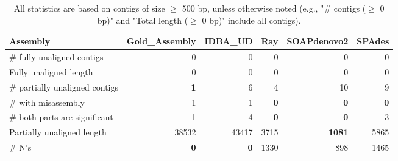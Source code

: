 \documentclass[12pt,a4paper]{article}
\begin{document}
\begin{table}[ht]
\begin{center}
\caption{All statistics are based on contigs of size $\geq$ 500 bp, unless otherwise noted (e.g., "\# contigs ($\geq$ 0 bp)" and "Total length ($\geq$ 0 bp)" include all contigs).}
\begin{tabular}{|l*{5}{|r}|}
\hline
Assembly & Gold\_Assembly & IDBA\_UD & Ray & SOAPdenovo2 & SPAdes \\ \hline
\# fully unaligned contigs & 0 & 0 & 0 & 0 & 0 \\ \hline
Fully unaligned length & 0 & 0 & 0 & 0 & 0 \\ \hline
\# partially unaligned contigs & {\bf 1} & 6 & 4 & 10 & 9 \\ \hline
\hspace{5mm}\# with misassembly & 1 & 1 & {\bf 0} & {\bf 0} & {\bf 0} \\ \hline
\hspace{5mm}\# both parts are significant & 1 & 4 & {\bf 0} & {\bf 0} & 3 \\ \hline
Partially unaligned length & 38532 & 43417 & 3715 & {\bf 1081} & 5865 \\ \hline
\# N's & {\bf 0} & {\bf 0} & 1330 & 898 & 1465 \\ \hline
\end{tabular}
\end{center}
\end{table}
\end{document}
